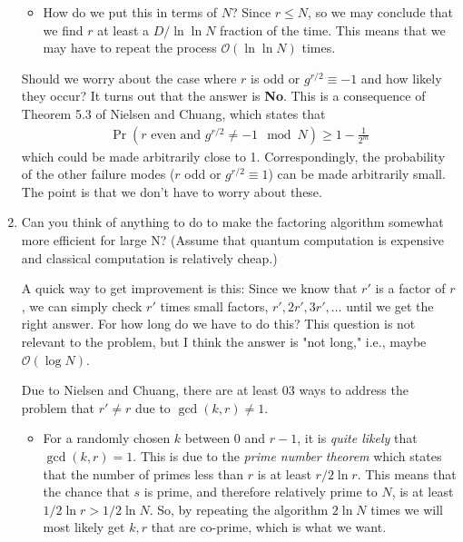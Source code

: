 \documentclass{article}
\theoremstyle{definition}
\newcommand{\f}[2]{\frac{#1}{#2}}
\newcommand{\lp}{\left(}
\newcommand{\rp}{\right)}
\begin{document}
\begin{enumerate}[label=(\alph*)]
\begin{itemize}
	\item How do we put this in terms of $N$? Since $ r \leq N$, so we may conclude that we find $r$ at least a $D/\ln \ln N$ fraction of the time. This means that we may have to repeat the process $\boxed{\mathcal{O}(\ln \ln N)}$ times.   
\end{itemize}

Should we worry about the case where $r$ is odd or $g^{r/2} \equiv -1$ and how likely they occur? It turns out that the answer is \textbf{No}. This is a consequence of Theorem 5.3 of Nielsen and Chuang, which states that
\begin{align*}
	\Pr \lp r \text{ even and } g^{r/2} \neq -1 \mod N  \rp \geq 1 - \f{1}{2^m} 
\end{align*}
which could be made arbitrarily close to 1. Correspondingly, the probability of the other failure modes ($r$ odd or $g^{r/2} \equiv 1$) can be made arbitrarily small. The point is that we don't have to worry about these. 

    

\item Can you think of anything to do to make the factoring algorithm somewhat more efficient for large N? (Assume that quantum computation is expensive and classical computation is relatively cheap.)


\noindent A quick way to get improvement is this: Since we know that $r'$ is a factor of $r$, we can simply check $r'$ times small factors, $r', 2r', 3r', \dots$ until we get the right answer. For how long do we have to do this? This question is not relevant to the problem, but I think the answer is "not long," i.e., maybe $\mathcal{O}(\log N)$.


\noindent Due to Nielsen and Chuang, there are at least 03 ways to address the problem that $r'\neq r$ due to $\gcd(k,r)\neq 1$. 
\begin{itemize}
	\item For a randomly chosen $k$ between $0$ and $r-1$, it is \textit{quite likely} that $\gcd(k,r) = 1$. This is due to the \textit{prime number theorem} which states that the number of primes less than $r$ is at least $r/2\ln r$. This means that the chance that $s$ is prime, and therefore relatively prime to $N$, is at least $1/2\ln r > 1/2 \ln N$. So, by repeating the algorithm $\boxed{2\ln N}$ times we will most likely get $k,r$ that are co-prime, which is what we want.
	

\end{itemize}
\end{enumerate}
\end{document}
